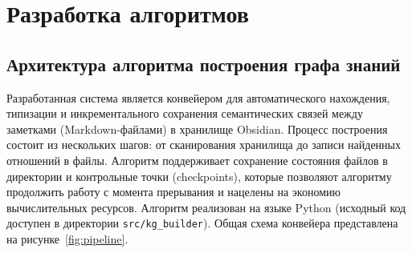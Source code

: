 \clearpage
\section{Разработка алгоритмов}
\subsection{Архитектура алгоритма построения графа знаний}

Разработанная система является конвейером для автоматического нахождения,
типизации и инкрементального сохранения семантических связей между
заметками (Markdown-файлами) в хранилище Obsidian.
Процесс построения состоит из нескольких шагов:
от сканирования хранилища до записи найденных отношений в файлы.
Алгоритм поддерживает сохранение состояния файлов в директории и
контрольные точки (checkpoints),
которые позволяют алгоритму продолжить работу с момента прерывания и
нацелены на экономию вычислительных ресурсов.
Алгоритм реализован на языке Python
(исходный код доступен в директории \texttt{src/kg\_builder}).
Общая схема конвейера представлена на рисунке~\ref{fig:pipeline}.

